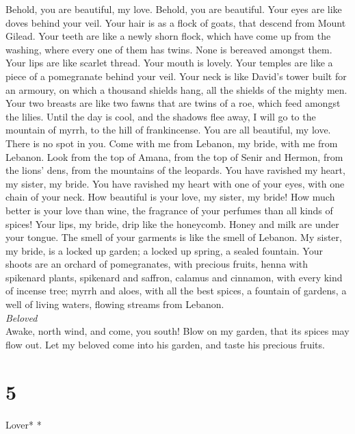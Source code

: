  Behold, you are beautiful, my love. Behold, you are
beautiful. Your eyes are like doves behind your veil. Your hair is as a
flock of goats, that descend from Mount Gilead.  Your
teeth are like a newly shorn flock, which have come up from the washing,
where every one of them has twins. None is bereaved amongst them.
 Your lips are like scarlet thread. Your mouth is lovely.
Your temples are like a piece of a pomegranate behind your veil.
 Your neck is like David's tower built for an armoury, on
which a thousand shields hang, all the shields of the mighty men.
 Your two breasts are like two fawns that are twins of a
roe, which feed amongst the lilies.  Until the day is
cool, and the shadows flee away, I will go to the mountain of myrrh, to
the hill of frankincense.  You are all beautiful, my love.
There is no spot in you.  Come with me from Lebanon, my
bride, with me from Lebanon. Look from the top of Amana, from the top of
Senir and Hermon, from the lions' dens, from the mountains of the
leopards.  You have ravished my heart, my sister, my
bride. You have ravished my heart with one of your eyes, with one chain
of your neck.  How beautiful is your love, my sister, my
bride! How much better is your love than wine, the fragrance of your
perfumes than all kinds of spices!  Your lips, my bride,
drip like the honeycomb. Honey and milk are under your tongue. The smell
of your garments is like the smell of Lebanon.  My
sister, my bride, is a locked up garden; a locked up spring, a sealed
fountain.  Your shoots are an orchard of pomegranates,
with precious fruits, henna with spikenard plants, 
spikenard and saffron, calamus and cinnamon, with every kind of incense
tree; myrrh and aloes, with all the best spices,  a
fountain of gardens, a well of living waters, flowing streams from
Lebanon.\\
\emph{Beloved}\\
 Awake, north wind, and come, you south! Blow on my
garden, that its spices may flow out. Let my beloved come into his
garden, and taste his precious fruits.

\hypertarget{section-4}{%
\section{5}\label{section-4}}

\emph{\hfill\break
}Lover* *\\

